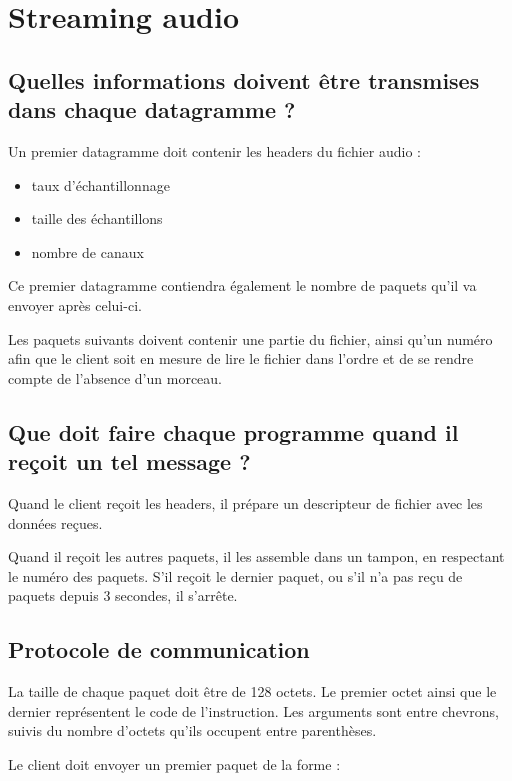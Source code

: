 \documentclass[a4paper,10pt,openany,oneside]{report}
\begin{document}
\section{Streaming audio}

\subsection{Quelles informations doivent être transmises dans chaque
            datagramme ?}

Un premier datagramme doit contenir les headers du fichier audio :

\begin{itemize}
    \item taux d'échantillonnage
    \item taille des échantillons
    \item nombre de canaux
\end{itemize}

Ce premier datagramme contiendra également le nombre de paquets qu'il va
envoyer après celui-ci.

Les paquets suivants doivent contenir une partie du fichier, ainsi qu'un numéro
afin que le client soit en mesure de lire le fichier dans l'ordre et de se
rendre compte de l'absence d'un morceau.

\subsection{Que doit faire chaque programme quand il reçoit un tel message ?}

Quand le client reçoit les headers, il prépare un descripteur de fichier avec
les données reçues.

Quand il reçoit les autres paquets, il les assemble dans un tampon, en
respectant le numéro des paquets. S'il reçoit le dernier paquet, ou s'il n'a
pas reçu de paquets depuis 3 secondes, il s'arrête.

\subsection{Protocole de communication}

La taille de chaque paquet doit être de 128 octets. Le premier octet ainsi que
le dernier représentent le code de l'instruction. Les arguments sont entre
chevrons, suivis du nombre d'octets qu'ils occupent entre parenthèses.

Le client doit envoyer un premier paquet de la forme :
\end{document}
